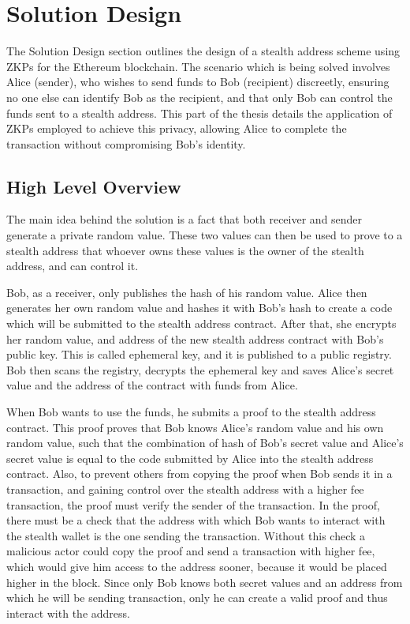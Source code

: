 \chapter{Solution Design}\label{chapter:solution}

The Solution Design section outlines the design of a stealth address
scheme using ZKPs for the Ethereum blockchain. The scenario which is being
solved involves Alice (sender), who wishes to send funds to Bob (recipient)
discreetly, ensuring no one else can identify Bob as the recipient, and that
only Bob can control the funds sent to a stealth address. This part of the
thesis details the application of ZKPs employed to achieve this privacy,
allowing Alice to complete the transaction without compromising Bob's identity.

\section{High Level Overview}

The main idea behind the solution is a fact that both
receiver and sender generate a private random value. These two values can then
be used to prove to a stealth address that whoever owns these values
is the owner of the stealth address, and can control it.

Bob, as a receiver, only publishes the hash of his random value. Alice then
generates her own random value and hashes it with Bob's hash to create a
code which will be submitted to the stealth address contract. After that, she
encrypts her random value, and address of the new stealth address
contract with Bob's public key. This is called ephemeral key, and it is published
to a public registry. Bob then scans the registry, decrypts the ephemeral key and
saves Alice's secret value and the address of the contract with funds from Alice.

When Bob wants to use the funds, he submits a proof to the stealth address
contract. This proof proves that Bob knows Alice's random value and his own
random value, such that the combination of hash of Bob's secret value and
Alice's secret value is equal to the code submitted by Alice into the stealth
address contract. Also, to prevent others from copying the proof when Bob
sends it in a transaction, and gaining control over the stealth address with a higher fee
transaction, the proof must verify the sender of the transaction. In the
proof, there must be a check that the address with which Bob wants to interact
with the stealth wallet is the one sending the transaction. Without this check
a malicious actor could copy the proof and send a transaction with higher fee,
which would give him access to the address sooner, because it would be placed
higher in the block. Since only Bob knows both secret values and an address
from which he will be sending transaction, only he can create a valid
proof and thus interact with the address.


